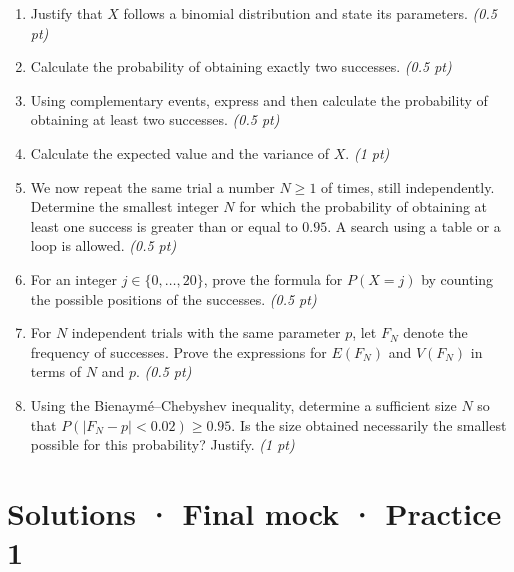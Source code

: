 \begin{enumerate}

\item Justify that $X$ follows a binomial distribution and state its parameters. \hfill\textit{(0.5 pt)}

\item Calculate the probability of obtaining exactly two successes. \hfill\textit{(0.5 pt)}

\item Using complementary events, express and then calculate the probability of obtaining at least two successes. \hfill\textit{(0.5 pt)}

\item Calculate the expected value and the variance of $X$. \hfill\textit{(1 pt)}

\item We now repeat the same trial a number $N\ge1$ of times, still independently. Determine the smallest integer $N$ for which the probability of obtaining at least one success is greater than or equal to $\num{0,95}$. A search using a table or a loop is allowed. \hfill\textit{(0.5 pt)}

\item For an integer $j\in\{0,\ldots,20\}$, prove the formula for $P(X=j)$ by counting the possible positions of the successes. \hfill\textit{(0.5 pt)}

\item For $N$ independent trials with the same parameter $p$, let $F_N$ denote the frequency of successes. Prove the expressions for $E(F_N)$ and $V(F_N)$ in terms of $N$ and $p$. \hfill\textit{(0.5 pt)}

\item Using the Bienaymé–Chebyshev inequality, determine a sufficient size $N$ so that $P(|F_N-p|<\num{0,02})\ge\num{0,95}$. Is the size obtained necessarily the smallest possible for this probability? Justify. \hfill\textit{(1 pt)}

\end{enumerate}

\ifmxteacher\mxnewpage

\section*{Solutions · Final mock · Practice 1}\label{cor:9-1}

